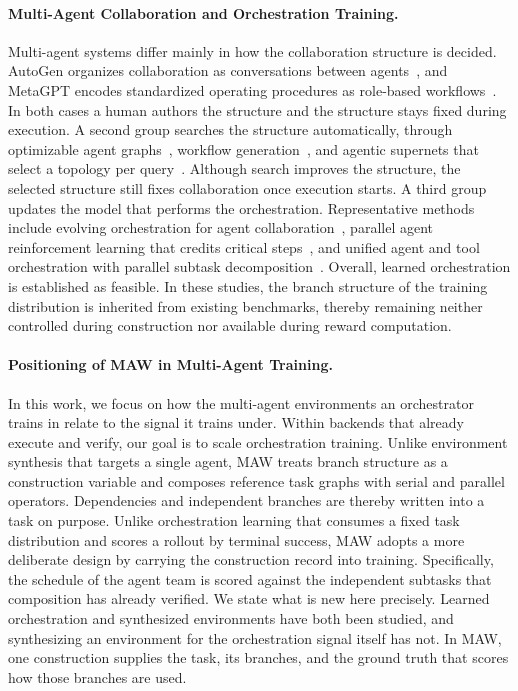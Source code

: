 \paragraph{Multi-Agent Collaboration and Orchestration Training.}
Multi-agent systems differ mainly in how the collaboration structure is decided.
AutoGen organizes collaboration as conversations between agents~\citep{wu2023autogenenablingnextgenllm}, and MetaGPT encodes standardized operating procedures as role-based workflows~\citep{hong2024metagptmetaprogrammingmultiagent}.
In both cases a human authors the structure and the structure stays fixed during execution.
A second group searches the structure automatically, through optimizable agent graphs~\citep{zhuge2024languageagentsoptimizablegraphs}, workflow generation~\citep{zhang2025aflowautomatingagenticworkflow,hu2025automateddesignagenticsystems}, and agentic supernets that select a topology per query~\citep{zhang2025maasagenticsupernet}.
Although search improves the structure, the selected structure still fixes collaboration once execution starts.
A third group updates the model that performs the orchestration.
Representative methods include evolving orchestration for agent collaboration~\citep{dang2025puppeteer}, parallel agent reinforcement learning that credits critical steps~\citep{kimiteam2026kimik25}, and unified agent and tool orchestration with parallel subtask decomposition~\citep{yuan2026paramanager}.
Overall, learned orchestration is established as feasible.
In these studies, the branch structure of the training distribution is inherited from existing benchmarks, thereby remaining neither controlled during construction nor available during reward computation.

\paragraph{Positioning of MAW in Multi-Agent Training.}
In this work, we focus on how the multi-agent environments an orchestrator trains in relate to the signal it trains under.
Within backends that already execute and verify, our goal is to scale orchestration training.
Unlike environment synthesis that targets a single agent, MAW treats branch structure as a construction variable and composes reference task graphs with serial and parallel operators.
Dependencies and independent branches are thereby written into a task on purpose.
Unlike orchestration learning that consumes a fixed task distribution and scores a rollout by terminal success, MAW adopts a more deliberate design by carrying the construction record into training.
Specifically, the schedule of the agent team is scored against the independent subtasks that composition has already verified.
We state what is new here precisely.
Learned orchestration and synthesized environments have both been studied, and synthesizing an environment for the orchestration signal itself has not.
In MAW, one construction supplies the task, its branches, and the ground truth that scores how those branches are used.
